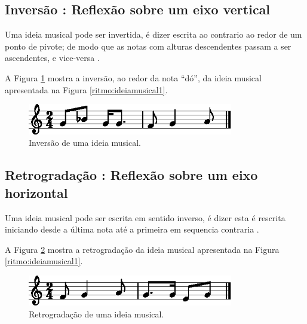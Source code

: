 \subsection{Inversão : Reflexão sobre um eixo vertical}
\label{subsec:inversaovertical}

Uma ideia musical pode ser invertida, é dizer escrita ao contrario ao redor de um ponto de pivote;
de modo que as notas com alturas descendentes passam a ser ascendentes, e vice-versa
\cite[pp. 30]{bennett1993elementos}.

A Figura \ref{ritmo:invert-ex1} mostra a inversão, ao redor da nota ``dó'', 
da ideia musical apresentada na Figura \ref{ritmo:ideiamusical1}.
\begin{figure}[H]
\centering
    \includegraphics[width=0.8\textwidth]{chapters/cap-musica-composer/invert-ex1-1.eps}
\caption{Inversão de uma ideia musical.}
\label{ritmo:invert-ex1}
\end{figure}


\subsection{Retrogradação : Reflexão sobre um eixo horizontal}

Uma ideia musical pode ser escrita em sentido inverso, 
é dizer esta é rescrita iniciando desde a última nota até a primeira em sequencia contraria 
\cite[pp. 77]{arbones2012armonia}.

A Figura \ref{ritmo:retrogrado-ex1} mostra a retrogradação
da ideia musical apresentada na Figura \ref{ritmo:ideiamusical1}.
\begin{figure}[H]
\vspace{-5px}
\centering
    \includegraphics[width=0.8\textwidth]{chapters/cap-musica-composer/retrogrado-ex1-1.eps}
\vspace{-5px}
\caption{Retrogradação de uma ideia musical.}
\label{ritmo:retrogrado-ex1}
\end{figure}


